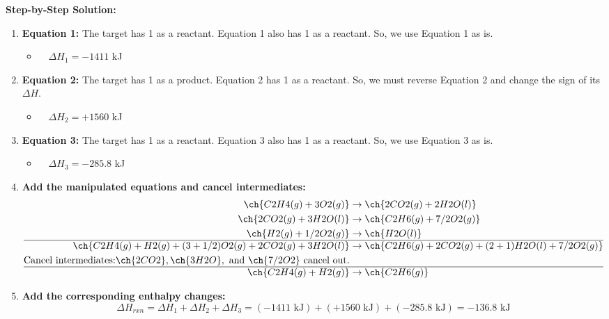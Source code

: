 \documentclass{article}
\begin{document}
\textbf{Step-by-Step Solution:}
\begin{enumerate}
    \item \textbf{Equation 1:} The target has 1  as a reactant. Equation 1 also has 1  as a reactant. So, we use Equation 1 as is.
    \begin{itemize}
        \item {} $\quad \Delta H_1 = -1411$ kJ
    \end{itemize}
    \item \textbf{Equation 2:} The target has 1  as a product. Equation 2 has 1  as a reactant. So, we must reverse Equation 2 and change the sign of its $\Delta H$.
    \begin{itemize}
        \item {} $\quad \Delta H_2 = +1560$ kJ
    \end{itemize}
    \item \textbf{Equation 3:} The target has 1  as a reactant. Equation 3 also has 1  as a reactant. So, we use Equation 3 as is.
    \begin{itemize}
        \item {} $\quad \Delta H_3 = -285.8$ kJ
    \end{itemize}
    \item \textbf{Add the manipulated equations and cancel intermediates:}
    \begin{align*}
        \ch{C2H4(g) + 3O2(g)} &\rightarrow \ch{2CO2(g) + 2H2O(l)} \\
        \ch{2CO2(g) + 3H2O(l)} &\rightarrow \ch{C2H6(g) + 7/2 O2(g)} \\
        \ch{H2(g) + 1/2 O2(g)} &\rightarrow \ch{H2O(l)} \\
        \hline
        \ch{C2H4(g) + H2(g) + (3 + 1/2)O2(g) + 2CO2(g) + 3H2O(l)} &\rightarrow \ch{C2H6(g) + 2CO2(g) + (2+1)H2O(l) + 7/2 O2(g)} \\
        \text{Cancel intermediates:} \ch{2CO2}, \ch{3H2O}, \text{ and } \ch{7/2 O2} \text{ cancel out.} \\
        \hline
        \ch{C2H4(g) + H2(g)} &\rightarrow \ch{C2H6(g)}
    \end{align*}
    \item \textbf{Add the corresponding enthalpy changes:}
    \[ \Delta H_{rxn} = \Delta H_1 + \Delta H_2 + \Delta H_3 = (-1411 \text{ kJ}) + (+1560 \text{ kJ}) + (-285.8 \text{ kJ}) = -136.8 \text{ kJ} \]
\end{enumerate}
\end{document}
